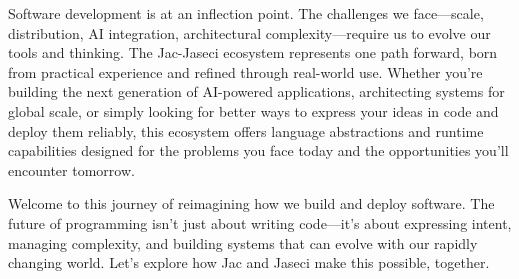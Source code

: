 Software development is at an inflection point. The challenges we face—scale, distribution, AI integration, architectural complexity—require us to evolve our tools and thinking. The Jac-Jaseci ecosystem represents one path forward, born from practical experience and refined through real-world use. Whether you're building the next generation of AI-powered applications, architecting systems for global scale, or simply looking for better ways to express your ideas in code and deploy them reliably, this ecosystem offers language abstractions and runtime capabilities designed for the problems you face today and the opportunities you'll encounter tomorrow.

Welcome to this journey of reimagining how we build and deploy software. The future of programming isn't just about writing code—it's about expressing intent, managing complexity, and building systems that can evolve with our rapidly changing world. Let's explore how Jac and Jaseci make this possible, together.